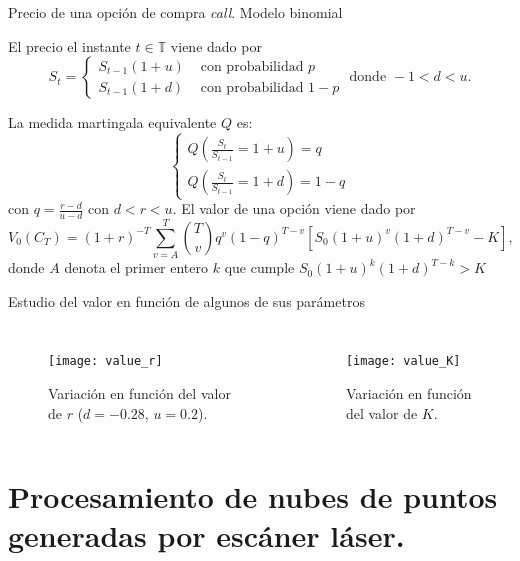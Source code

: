 \documentclass[9pt]{beamer}
\begin{document}
	\begin{frame}{Precio de una opción de compra \textit{call}. Modelo binomial}
		
	El precio el instante $ t \in \mathbb{T} $ viene dado por
	\[
	S_t =  \begin{cases}
	S_{t-1}(1+u) & \text{ con probabilidad } p\\
	S_{t-1}(1+d) & \text{ con probabilidad } 1-p
	\end{cases} \text{ donde }-1 < d <u.
	\]
		
	La medida martingala equivalente $ Q $ es:
	\[
	\begin{cases}
	Q (\frac{S_t}{S_{t-1}} = 1+u ) =  q \\
	Q (\frac{S_t}{S_{t-1}} = 1+d ) =  1-q
	\end{cases}
	\]
	con $ q = \frac{r-d}{u-d} $ con $ d < r < u $. El valor de una opción viene dado por
	\begin{equation*}
	V_0(C_T) = (1+r)^{-T} \sum_{v=A}^{T}\binom{T}{v}q^v(1-q)^{T-v}\left[S_0(1+u)^v(1+d)^{T-v}-K\right],
	\end{equation*}
	donde $ A $ denota el primer entero $ k $ que cumple $ S_0(1+u)^k(1+d)^{T-k} > K $
	
	\end{frame}
	
	\begin{frame}{Estudio del valor en función de algunos de sus parámetros}
		\begin{columns}
			\begin{figure}[h!]
				\texttt{[image: value\_r]}
				\caption{Variación en función del valor de $ r $ ($ d= -0.28 $, $ u=0.2 $).}
			\end{figure}
			\begin{figure}[h!]
				\texttt{[image: value\_K]}
				\caption{Variación en función del valor de $ K $.}
			\end{figure} 
		\end{columns}
	\end{frame}
	
	\section[Procesamiento de nubes de puntos generadas por escáner láser]{Procesamiento de nubes de puntos generadas por escáner láser.}
\end{document}

